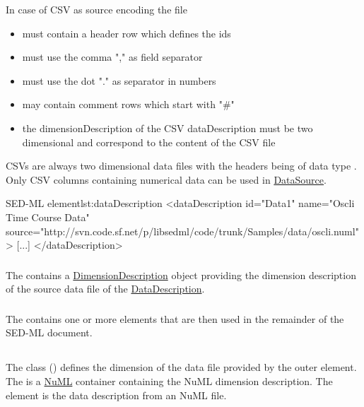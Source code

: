 In case of CSV as source encoding the file
\begin{itemize}
	\item must contain a header row which defines the ids
	\item must use the comma "," as field separator
	\item must use the dot "." as separator in numbers
	\item may contain comment rows which start with "\#"
	\item the dimensionDescription of the CSV dataDescription must be two dimensional and correspond to the content of the CSV file 
\end{itemize}
CSVs are always two dimensional data files with the headers being of data type \hyperref[type:numlsid]{}. Only CSV columns containing numerical data can be used in \hyperref[class:dataSource]{DataSource}.

\begin{myXmlLst}{SED-ML  element}{lst:dataDescription}
<dataDescription id="Data1" name="Oscli Time Course Data" 
	source="http://svn.code.sf.net/p/libsedml/code/trunk/Samples/data/oscli.numl" >
    [...]
</dataDescription>
\end{myXmlLst} 


\subsubsection{}
\label{sec:dimensionDescription}
The  contains a \hyperref[class:dimensionDescription]{DimensionDescription} object providing the dimension description of the source data file of the \hyperref[class:dataDescription]{DataDescription}.


\subsubsection{}
\label{sec:listOfDataSources}
The  contains one or more \SedDataSource elements that are then used in the remainder of the SED-ML document.


\subsection{}
\label{class:dimensionDescription}
The  class () defines the dimension of the data file provided by the outer \SedDataDescription element. The  is a \hyperref[sec:numl]{NuML} container containing the NuML dimension description. The \hyperref[sec:dimensionDescription]{} element is the data description from an NuML file. 

